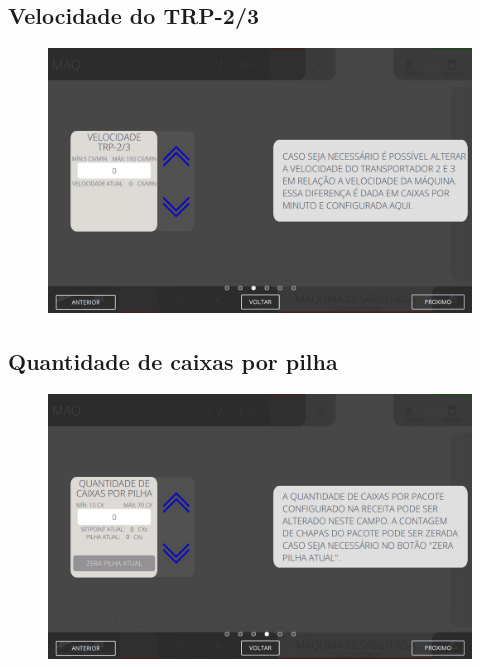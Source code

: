 \newpage
\thispagestyle{fancy}
\vspace{\fill}
\subsection{\small Velocidade do TRP-2/3}
\begin{figure}
    \centering
    \includegraphics[width=576 px,height=360 px]{src/imagesICV/08-stacker/settings/3.png}
\end{figure}

\newpage
\thispagestyle{fancy}
\vspace{\fill}
\subsection{\small Quantidade de caixas por pilha}
\begin{figure}
    \centering
    \includegraphics[width=576 px,height=360 px]{src/imagesICV/08-stacker/settings/4.png}
\end{figure}

